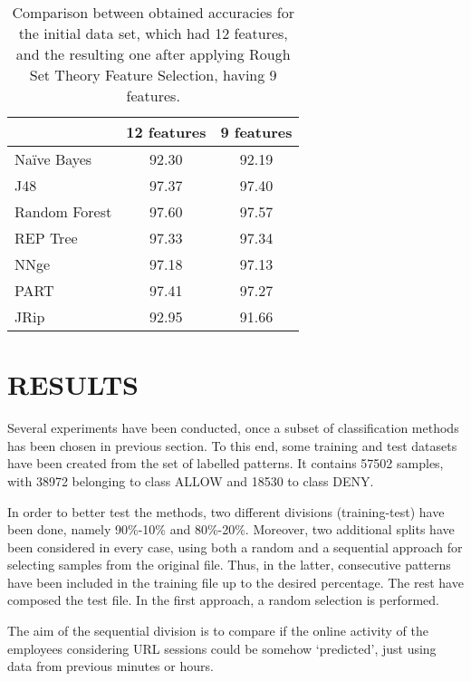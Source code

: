 \documentclass{llncs}
\begin{document}
\begin{table}[htpb]
\centering
 \caption{\label{tab_12featvs9feat} Comparison between obtained accuracies for the initial data set, which had 12 features, and the resulting one after applying Rough Set Theory Feature Selection, having 9 features.}
{\small
\begin{tabular}{|l|c|c|}
\cline{2-3}
\multicolumn{1}{l|}{} & 12 features & 9 features \\ 
\hline
Naïve Bayes & 92.30 & 92.19 \\ 
\cline{1-1}
J48 & 97.37 & 97.40 \\ 
\cline{1-1}
Random Forest & 97.60 & 97.57 \\
\cline{1-1}
REP Tree & 97.33 & 97.34 \\ 
\cline{1-1}
NNge & 97.18 & 97.13 \\ 
\cline{1-1}
PART & 97.41 & 97.27 \\ 
\cline{1-1}
JRip & 92.95 & 91.66 \\ 
\hline
\end{tabular}
}
\end{table}


%
\section{\uppercase{Results}}
\label{sec:results}

\noindent Several experiments have been conducted, once a subset of classification methods has been chosen in previous section.
To this end, some training and test datasets have been created from
the set of labelled patterns. It contains 57502 samples, with 38972
belonging to class ALLOW and 18530 to class DENY.

In order to better test the methods, two different divisions (training-test) have been done, namely 90\%-10\% and 80\%-20\%. Moreover, two additional splits have been considered in every case, using both a random and a sequential approach for selecting samples from the original file. Thus, in the latter, consecutive patterns have been included in the training file up to the desired percentage. The rest have composed the test file. In the first approach, a random selection is performed.

The aim of the sequential division is to compare if the online activity of the employees considering URL sessions could be somehow `predicted', just using data from previous minutes or hours.
\end{document}
